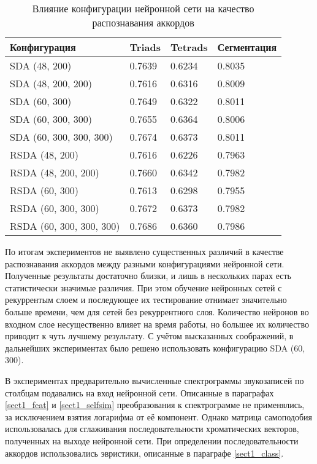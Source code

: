 \begin{table} [htbp]
  \centering
  \parbox{15cm}{\caption{Влияние конфигурации нейронной сети на качество
  распознавания аккордов} \label{Tnnconf}}
  \begin{tabular}{|l|l|l|l|}
  \hline
  Конфигурация & Triads & Tetrads & Сегментация \\
  \hline
  SDA (48, 200) & 0.7639 & 0.6234 & 0.8035 \\
  SDA (48, 200, 200) & 0.7616 & 0.6316 & 0.8009 \\
  SDA (60, 300) & 0.7649 & 0.6322 & 0.8011 \\
  SDA (60, 300, 300) & 0.7655 & 0.6364 & 0.8006 \\
  SDA (60, 300, 300, 300) & 0.7674 & 0.6373 & 0.8011 \\
  \hline
  RSDA (48, 200) & 0.7616 & 0.6226 & 0.7963 \\
  RSDA (48, 200, 200) & 0.7660 & 0.6342 & 0.7982 \\
  RSDA (60, 300) & 0.7613 & 0.6298 & 0.7955 \\
  RSDA (60, 300, 300) & 0.7672 & 0.6373 & 0.7982 \\
  RSDA (60, 300, 300, 300) & 0.7686 & 0.6360 & 0.7986 \\
  \hline
  \end{tabular}
\end{table}

По итогам экспериментов не выявлено существенных различий в качестве
распознавания аккордов между разными конфигурациями нейронной сети. Полученные
результаты достаточно близки, и лишь в нескольких парах есть статистически
значимые различия. При этом обучение нейронных сетей с рекуррентым слоем и
последующее их тестирование отнимает значительно больше времени, чем для сетей
без рекуррентного слоя. Количество нейронов во входном слое несущественно влияет
на время работы, но большее их количество приводит к чуть лучшему результату. С
учётом высказанных соображений, в дальнейших экспериментах было решено
использовать конфигурацию SDA (60, 300).

В экспериментах предварительно вычисленные спектрограммы звукозаписей по
столбцам подавались на вход нейронной сети. Описанные в параграфах
\ref{sect1_feat} и \ref{sect1_selfsim} преобразования к спектрограмме не
применялись, за исключением взятия логарифма от её компонент. Однако матрица
самоподобия использовалась для сглаживания последовательности хроматических
векторов, полученных на выходе нейронной сети. При определении
последовательности аккордов использовались эвристики, описанные в параграфе
\ref{sect1_class}.

